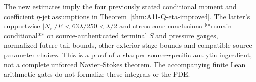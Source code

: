 The new estimates imply the four previously stated conditional
moment and coefficient $\eta$-jet assumptions in
Theorem~\ref{thm:A11-Q-eta-improved}. The latter's supportwise
$|N_s|/E<63\lambda/250<\lambda/2$ and stress-cone conclusions
**remain conditional** on source-authenticated terminal $S$ and
pressure gauges, normalized future tail bounds, other exterior-stage
bounds and compatible source parameter choices. This is a proof of
a sharper source-specific analytic ingredient, not a complete unforced
Navier--Stokes theorem. The accompanying finite Lean arithmetic gates
do not formalize these integrals or the PDE.
